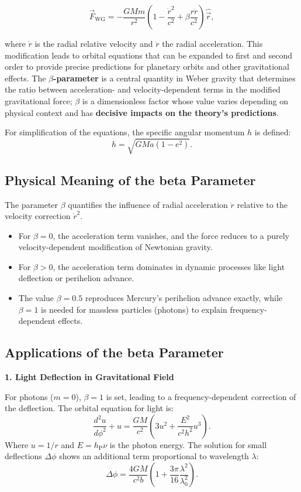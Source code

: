 \begin{equation}
    \label{eq:wg-beta}
    \vec{F}_{\text{WG}} = -\frac{GMm}{r^2} \left(1 - \frac{\dot{r}^2}{c^2} + \beta \frac{r\ddot{r}}{c^2}\right) \hat{\vec{r}},
\end{equation}

where $\dot{r}$ is the radial relative velocity and $\ddot{r}$ the radial acceleration. This modification leads to orbital equations that can be
expanded to first and second order to provide precise predictions for planetary orbits and other gravitational effects. The \textbf{$\beta$-parameter} is
a central quantity in Weber gravity that determines the ratio between acceleration- and velocity-dependent terms in the modified
gravitational force; $\beta$ is a dimensionless factor whose value varies depending on physical context and has \textbf{decisive impacts on the theory's predictions}.

For simplification of the equations, the specific angular momentum $h$ is defined:
\begin{equation}
h = \sqrt{GMa(1 - e^2)}.
\end{equation}

\subsection{Physical Meaning of the beta Parameter}
The parameter $\beta$ quantifies the influence of radial acceleration $\ddot{r}$ relative to the velocity correction $\dot{r}^2$.
\begin{itemize}
    \item For $\beta=0$, the acceleration term vanishes, and the force reduces to a purely velocity-dependent modification of Newtonian gravity.
    \item For $\beta>0$, the acceleration term dominates in dynamic processes like light deflection or perihelion advance.
    \item The value $\beta=0.5$ reproduces Mercury's perihelion advance exactly, while $\beta=1$ is needed for massless particles (photons) to explain frequency-dependent effects.
\end{itemize}

\subsection{Applications of the beta Parameter}
\textbf{1. Light Deflection in Gravitational Field}

For photons ($m=0$), $\beta=1$ is set, leading to a frequency-dependent correction of the deflection. The orbital equation for light is:
\begin{equation}
    \frac{d^2u}{d\phi^2} + u = \frac{GM}{c^2} \left(3u^2 + \frac{E^2}{c^2 h^2} u^3\right).
\end{equation}
Where $u=1/r$ and $E=h_\text{P}\nu$ is the photon energy. The solution for small deflections $\Delta\phi$ shows an additional term proportional to wavelength $\lambda$:
\begin{equation}
\Delta \phi = \frac{4GM}{c^2 b} \left(1 + \frac{3\pi}{16} \frac{\lambda^2}{\lambda_0^2}\right).
\end{equation}

